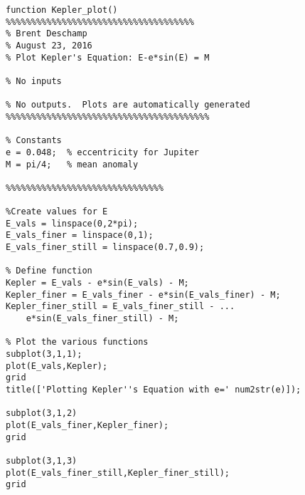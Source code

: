 \documentclass[11pt]{article}
\begin{document}
\pagebreak

\begin{lstlisting}[caption={MATLAB code for plotting Kepler's equation.}, label={code:Kepler}, frame=tb]
function Kepler_plot()
%%%%%%%%%%%%%%%%%%%%%%%%%%%%%%%%%%%%%
% Brent Deschamp
% August 23, 2016
% Plot Kepler's Equation: E-e*sin(E) = M

% No inputs

% No outputs.  Plots are automatically generated
%%%%%%%%%%%%%%%%%%%%%%%%%%%%%%%%%%%%%%%%

% Constants
e = 0.048;  % eccentricity for Jupiter
M = pi/4;   % mean anomaly

%%%%%%%%%%%%%%%%%%%%%%%%%%%%%%%

%Create values for E
E_vals = linspace(0,2*pi);
E_vals_finer = linspace(0,1);
E_vals_finer_still = linspace(0.7,0.9);

% Define function
Kepler = E_vals - e*sin(E_vals) - M;
Kepler_finer = E_vals_finer - e*sin(E_vals_finer) - M;
Kepler_finer_still = E_vals_finer_still - ...
	e*sin(E_vals_finer_still) - M;

% Plot the various functions
subplot(3,1,1);
plot(E_vals,Kepler);
grid
title(['Plotting Kepler''s Equation with e=' num2str(e)]);

subplot(3,1,2)
plot(E_vals_finer,Kepler_finer);
grid

subplot(3,1,3)
plot(E_vals_finer_still,Kepler_finer_still);
grid
\end{lstlisting}
\end{document}
